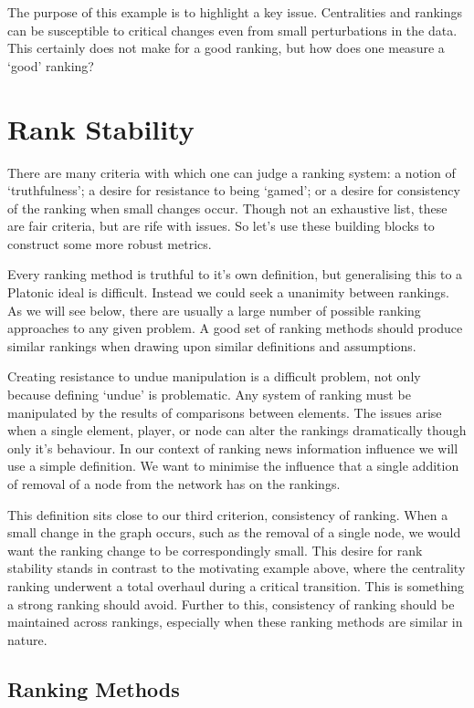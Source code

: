 The purpose of this example is to highlight a key issue. Centralities and rankings can be susceptible to critical changes even from small perturbations in the data. This certainly does not make for a good ranking, but how does one measure a `good' ranking?


\section{Rank Stability}

There are many criteria with which one can judge a ranking system: a notion of `truthfulness'; a desire for resistance to being `gamed'; or a desire for consistency of the ranking when small changes occur. Though not an exhaustive list, these are fair criteria, but are rife with issues. So let's use these building blocks to construct some more robust metrics.

Every ranking method is truthful to it's own definition, but generalising this to a Platonic ideal is difficult. Instead we could seek a unanimity between rankings. As we will see below, there are usually a large number of possible ranking approaches to any given problem. A good set of ranking methods should produce similar rankings when drawing upon similar definitions and assumptions.

Creating resistance to undue manipulation is a difficult problem, not only because defining `undue' is problematic. Any system of ranking must be manipulated by the results of comparisons between elements. The issues arise when a single element, player, or node can alter the rankings dramatically though only it's behaviour. In our context of ranking news information influence we will use a simple definition. We want to minimise the influence that a single addition of removal of a node from the network has on the rankings.

This definition sits close to our third criterion, consistency of ranking. When a small change in the graph occurs, such as the removal of a single node, we would want the ranking change to be correspondingly small. This desire for rank stability stands in contrast to the motivating example above, where the centrality ranking underwent a total overhaul during a critical transition. This is something a strong ranking should avoid. Further to this, consistency of ranking should be maintained across rankings, especially when these ranking methods are similar in nature. 


\subsection{Ranking Methods}

